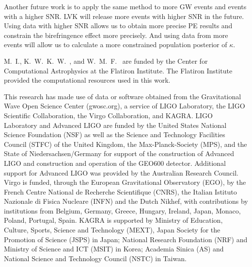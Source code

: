 \documentclass[aps,prd,twocolumn,superscriptaddress,preprintnumbers,floatfix,nofootinbib]{revtex4-2}
\begin{document}
Another future work is to apply the same method to more \ac{GW} events and events with a higher \ac{SNR}.
\ac{LVK} will release more events with higher \ac{SNR} in the future.
Using data with higher \ac{SNR} allows us to obtain more precise \ac{PE} results and constrain the birefringence effect more precisely.
And using data from more events will allow us to calculate a more constrained population posterior of $\kappa$.

\begin{acknowledgments}
M.~I., K.~W.~K.~W.~, and W.~M.~F.~ are funded by the Center for Computational Astrophysics at the Flatiron Institute.
The Flatiron Institute provided the computational resources used in this work.

This research has made use of data or software obtained from the Gravitational Wave Open Science Center (gwosc.org), a service of LIGO Laboratory, the LIGO Scientific Collaboration, the Virgo Collaboration, and KAGRA.
LIGO Laboratory and Advanced LIGO are funded by the United States National Science Foundation (NSF) as well as the Science and Technology Facilities Council (STFC) of the United Kingdom, the Max-Planck-Society (MPS), and the State of Niedersachsen/Germany for support of the construction of Advanced LIGO and construction and operation of the GEO600 detector.
Additional support for Advanced LIGO was provided by the Australian Research Council.
Virgo is funded, through the European Gravitational Observatory (EGO), by the French Centre National de Recherche Scientifique (CNRS), the Italian Istituto Nazionale di Fisica Nucleare (INFN) and the Dutch Nikhef, with contributions by institutions from Belgium, Germany, Greece, Hungary, Ireland, Japan, Monaco, Poland, Portugal, Spain.
KAGRA is supported by Ministry of Education, Culture, Sports, Science and Technology (MEXT), Japan Society for the Promotion of Science (JSPS) in Japan; National Research Foundation (NRF) and Ministry of Science and ICT (MSIT) in Korea; Academia Sinica (AS) and National Science and Technology Council (NSTC) in Taiwan.
\end{acknowledgments}

\appendix


\end{document}
